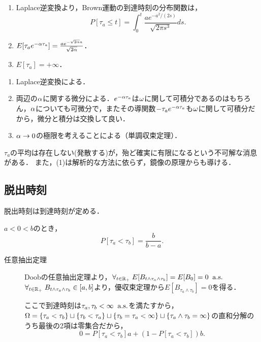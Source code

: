 \documentclass[uplatex,dvipdfmx]{jsreport}
\begin{document}
\begin{corollary}[到達時刻の分布]\mbox{}
    \begin{enumerate}
        \item Laplace逆変換より，Brown運動の到達時刻の分布関数は，
        \[P[\tau_a\le t]=\int^t_0\frac{ae^{-a^2/(2s)}}{\sqrt{2\pi s^3}}ds.\]
        \item $E[\tau_ae^{-\alpha\tau_a}]=\frac{ae^{-\sqrt{2\alpha}a}}{\sqrt{2\alpha}}$．
        \item $E[\tau_a]=+\infty$．
    \end{enumerate}
\end{corollary}
\begin{Proof}\mbox{}
    \begin{enumerate}
        \item Laplace逆変換による．
        \item 両辺の$\alpha$に関する微分による．$e^{-\alpha\tau_a}$は$\omega$に関して可積分であるのはもちろん，$\alpha$についても可微分で，またその導関数$-\tau_ae^{-\alpha\tau_a}$も$\omega$に関して可積分だから，微分と積分は交換して良い．
        \item $\alpha\to0$の極限を考えることによる（単調収束定理）．
    \end{enumerate}
\end{Proof}
\begin{remarks}
    $\tau_a$の平均は存在しない(発散する)が，殆ど確実に有限になるという不可解な消息がある．
    また，(1)は解析的な方法に依らず，鏡像の原理からも導ける．
\end{remarks}

\subsection{脱出時刻}

\begin{tcolorbox}[colframe=ForestGreen, colback=ForestGreen!10!white,breakable,colbacktitle=ForestGreen!40!white,coltitle=black,fonttitle=\bfseries\sffamily,
title=]
    脱出時刻は到達時刻が定める．
\end{tcolorbox}

\begin{proposition}[どっちの端から脱出するかの確率]
    $a<0<b$のとき，
    \[P[\tau_a<\tau_b]=\frac{b}{b-a}.\]
\end{proposition}
\begin{Proof}\mbox{}
    \begin{description}
        \item[任意抽出定理] Doobの任意抽出定理より，$\forall_{t\in\mathbb{R}_+}\;E[B_{t\land\tau_a\land\tau_b}]=E[B_0]=0\;\;\mathrm{a.s.}$
        $\forall_{t\in\mathbb{R}_+}\;B_{t\land\tau_a\land\tau_b}\in[a,b]$より，優収束定理から$E[B_{\tau_a\land\tau_b}]=0$を得る．

        ここで到達時刻は$\tau_a,\tau_b<\infty\;\;\mathrm{a.s.}$を満たすから，$\Omega=\left\{\tau_a<\tau_b\right\}\sqcup\left\{\tau_b<\tau_a\right\}\sqcup\left\{\tau_b=\tau_a<\infty\right\}\sqcup\left\{\tau_a\land\tau_b=\infty\right\}$の直和分解のうち最後の2項は零集合だから，
        \[0=P[\tau_a<\tau_b]a+(1-P[\tau_a<\tau_b])b.\]
    \end{description}
\end{Proof}
\end{document}
